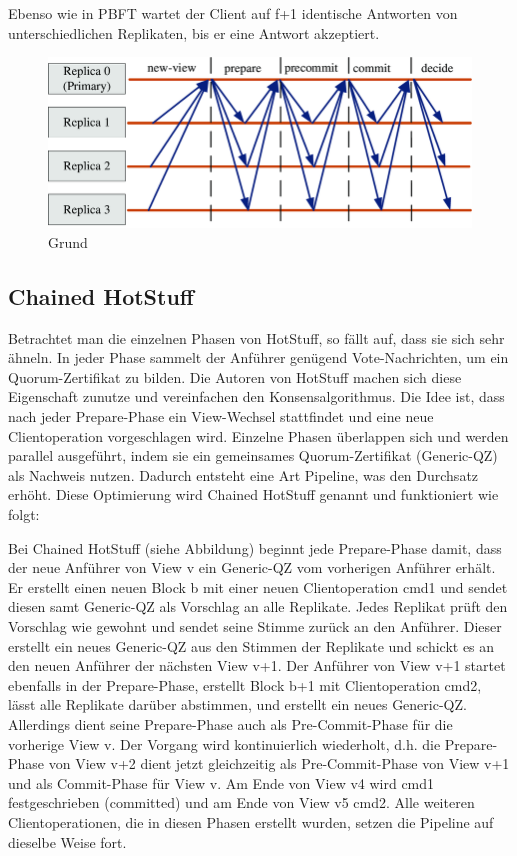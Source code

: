 \documentclass[nonacm,sigconf,natbib=false]{acmart}
\begin{document}
Ebenso wie in PBFT wartet der Client auf f+1 identische Antworten von unterschiedlichen Replikaten, bis er eine Antwort akzeptiert.

\begin{figure}[htbp]
  \centering
  \includegraphics[width=\linewidth]{hotstuff.png}
  \caption{Grund}
  \label{fig:hotstuff}
\end{figure}

\subsection{Chained HotStuff}

Betrachtet man die einzelnen Phasen von HotStuff, so fällt auf, dass sie sich sehr ähneln. In jeder Phase sammelt der Anführer genügend Vote-Nachrichten, um ein Quorum-Zertifikat zu bilden. Die Autoren von HotStuff machen sich diese Eigenschaft zunutze und vereinfachen den Konsensalgorithmus. Die Idee ist, dass nach jeder Prepare-Phase ein View-Wechsel stattfindet und eine neue Clientoperation vorgeschlagen wird. Einzelne Phasen überlappen sich und werden parallel ausgeführt, indem sie ein gemeinsames Quorum-Zertifikat (Generic-QZ) als Nachweis nutzen. Dadurch entsteht eine Art Pipeline, was den Durchsatz erhöht. Diese Optimierung wird Chained HotStuff genannt und funktioniert wie folgt:

Bei Chained HotStuff (siehe Abbildung) beginnt jede Prepare-Phase damit, dass der neue Anführer von View v ein Generic-QZ vom vorherigen Anführer erhält. Er erstellt einen neuen Block b mit einer neuen Clientoperation cmd1 und sendet diesen samt Generic-QZ als Vorschlag an alle Replikate. Jedes Replikat prüft den Vorschlag wie gewohnt und sendet seine Stimme zurück an den Anführer. Dieser erstellt ein neues Generic-QZ aus den Stimmen der Replikate und schickt es an den neuen Anführer der nächsten View v+1. Der Anführer von View v+1 startet ebenfalls in der Prepare-Phase, erstellt Block b+1 mit Clientoperation cmd2, lässt alle Replikate darüber abstimmen, und erstellt ein neues Generic-QZ. Allerdings dient seine Prepare-Phase auch als Pre-Commit-Phase für die vorherige View v. Der Vorgang wird kontinuierlich wiederholt, d.h. die Prepare-Phase von View v+2 dient jetzt gleichzeitig als Pre-Commit-Phase von View v+1 und als Commit-Phase für View v. Am Ende von View v4 wird cmd1 festgeschrieben (committed) und am Ende von View v5 cmd2. Alle weiteren Clientoperationen, die in diesen Phasen erstellt wurden, setzen die Pipeline auf dieselbe Weise fort.
\end{document}
